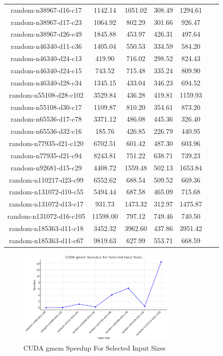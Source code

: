 \documentclass[letterpaper,12pt]{article}
\theoremstyle{remark}
\begin{document}
\begin{table}[ht]
\begin{tabular}{|c|c|c|c|c|c|c|}
random-n38967-d16-c17& 1142.14  & 1051.02 & 308.49  & 1294.61 \\
random-n38967-d17-c23& 1064.92  & 802.29  & 301.66  & 926.47 \\
random-n38967-d26-c49& 1845.88  & 453.97  & 426.31  & 497.64 \\
random-n46340-d11-c36& 1405.04  & 550.53  & 334.59  & 584.20 \\
random-n46340-d24-c13& 419.90   & 716.02  & 298.52  & 824.43 \\
random-n46340-d24-c15& 743.52   & 715.48  & 335.24  & 809.90 \\
random-n46340-d28-c34& 1345.15  & 433.04  & 346.23  & 694.52 \\
random-n55108-d28-c102& 3529.84 & 436.28  & 419.81  & 1159.93 \\
random-n55108-d30-c17 & 1109.87 & 810.20  & 354.61  & 873.20 \\
random-n65536-d17-c78 & 3371.12 & 486.08  & 445.36  & 326.40 \\
random-n65536-d32-c16 & 185.76  & 426.85  & 226.79  & 440.95 \\
random-n77935-d21-c120& 6702.51 & 601.42  & 487.30  & 603.96 \\
random-n77935-d21-c94 & 8243.81 & 751.22  & 638.71  & 739.23 \\
random-n92681-d15-c29 & 4408.72 & 1559.48 & 502.13  & 1653.84 \\
random-n110217-d23-c99& 6552.62 & 688.54  & 509.52  & 669.36 \\
random-n131072-d10-c55& 5494.44 & 687.58  & 465.09  & 715.68 \\
random-n131072-d13-c17& 931.73  & 1473.32 & 312.97  & 1475.87 \\
random-n131072-d16-c105& 11598.00& 797.12 & 749.46  & 740.50 \\
random-n185363-d11-c18& 3452.32 & 3962.60 & 437.86  & 3951.42 \\
random-n185363-d11-c67& 9819.63 & 627.99  & 553.71  & 668.59 \\
\hline
\end{tabular}
\end{table}

\clearpage

\begin{figure}[ht]
    \centering
    \includegraphics[width=0.7\textwidth]{cudaGmemSpeedup.png}
    \caption{CUDA gmem Speedup For Selected Input Sizes}
    \label{fig:gmem_speedup}
\end{figure}
\end{document}
